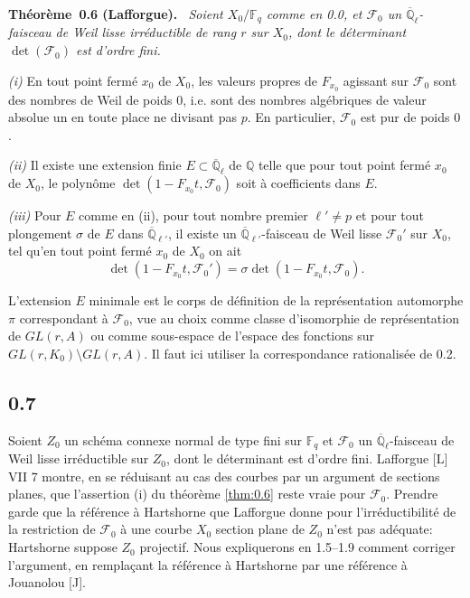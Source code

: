 \documentclass[10pt,a4paper]{article}
\makeatletter
\theoremstyle{plain}
\theoremstyle{definition}
\newenvironment{manualblock}[4]{%
  \par\medskip\noindent\textbf{#1~#2#3.}\def\@currentlabel{#2}\label{#4}\itshape\ }{\par\normalfont\medskip}
\makeatother
\begin{document}
\begin{manualblock}{Théorème}{0.6}{ (Lafforgue)}{thm:0.6}
Soient $X_0/\mathbb{F}_q$ comme en 0.0, et $\mathcal{F}_0$ un $\overline{\mathbb{Q}}_\ell$-faisceau de Weil lisse irr\'eductible de rang $r$ sur $X_0$, dont le d\'eterminant $\det(\mathcal{F}_0)$ est d'ordre fini.

\emph{(i)} En tout point ferm\'e $x_0$ de $X_0$, les valeurs propres de $F_{x_0}$ agissant sur $\mathcal{F}_0$ sont des nombres de Weil de poids $0$, i.e. sont des nombres alg\'ebriques de valeur absolue un en toute place ne divisant pas $p$. En particulier, $\mathcal{F}_0$ est pur de poids $0$.

\emph{(ii)} Il existe une extension finie $E \subset \overline{\mathbb{Q}}_\ell$ de $\mathbb{Q}$ telle que pour tout point ferm\'e $x_0$ de $X_0$, le polyn\^ome $\det(1 - F_{x_0}t, \mathcal{F}_0)$ soit \`a coefficients dans $E$.

\emph{(iii)} Pour $E$ comme en (ii), pour tout nombre premier $\ell' \neq p$ et pour tout plongement $\sigma$ de $E$ dans $\overline{\mathbb{Q}}_{\ell'}$, il existe un $\overline{\mathbb{Q}}_{\ell'}$-faisceau de Weil lisse $\mathcal{F}_0'$ sur $X_0$, tel qu'en tout point ferm\'e $x_0$ de $X_0$ on ait
\[
\det(1 - F_{x_0}t, \mathcal{F}_0') = \sigma \det(1 - F_{x_0}t, \mathcal{F}_0).
\]
\end{manualblock}

L'extension $E$ minimale est le corps de d\'efinition de la repr\'esentation automorphe $\pi$ correspondant \`a $\mathcal{F}_0$, vue au choix comme classe d'isomorphie de repr\'esentation de $GL(r,A)$ ou comme sous-espace de l'espace des fonctions sur $GL(r,K_0) \setminus GL(r,A)$. Il faut ici utiliser la correspondance rationalis\'ee de 0.2.

\subsection*{0.7}

Soient $Z_0$ un sch\'ema connexe normal de type fini sur $\mathbb{F}_q$ et $\mathcal{F}_0$ un $\overline{\mathbb{Q}}_\ell$-faisceau de Weil lisse irr\'eductible sur $Z_0$, dont le d\'eterminant est d'ordre fini. Lafforgue [L] VII 7 montre, en se r\'eduisant au cas des courbes par un argument de sections planes, que l'assertion (i) du th\'eor\`eme \ref{thm:0.6} reste vraie pour $\mathcal{F}_0$. Prendre garde que la r\'ef\'erence \`a Hartshorne que Lafforgue donne pour l'irr\'eductibilit\'e de la restriction de $\mathcal{F}_0$ \`a une courbe $X_0$ section plane de $Z_0$ n'est pas ad\'equate: Hartshorne suppose $Z_0$ projectif. Nous expliquerons en 1.5--1.9 comment corriger l'argument, en rempla\c{c}ant la r\'ef\'erence \`a Hartshorne par une r\'ef\'erence \`a Jouanolou [J].
\end{document}
